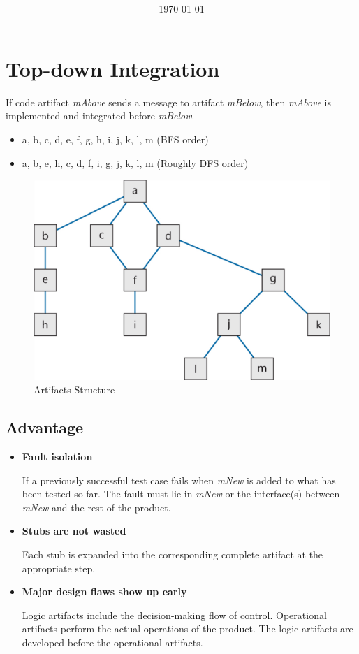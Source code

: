 \documentclass[11pt]{article}
\title{\textbf{\Topic}}
\author{\Name}
\date{\today}
\begin{document}
\maketitle
\noindent\makebox[\linewidth]{\rule[8pt]{5in}{0.5pt}}

\section*{Top-down Integration}

If code artifact \textit{mAbove} sends a message to artifact \textit{mBelow}, then \textit{mAbove} is implemented and integrated before \textit{mBelow}.

\begin{itemize}
	\item a, b, c, d, e, f, g, h, i, j, k, l, m (BFS order)
	\item a, b, e, h, c, d, f, i, g, j, k, l, m (Roughly DFS order)
\end{itemize}

\begin{figure}[h]
	\centering
	\includegraphics[width=0.6\linewidth]{images/TopDown.png}
	\caption{Artifacts Structure}
	\label{fig:TopDown}
\end{figure}

\subsection*{Advantage}

\begin{itemize}
	\item \textbf{Fault isolation}
	
	If a previously successful test case fails when \textit{mNew} is added to what has been tested so far. The fault must lie in \textit{mNew} or the interface(s) between \textit{mNew} and the rest of the product.
	
	\item \textbf{Stubs are not wasted}
	
	Each stub is expanded into the corresponding complete artifact at the appropriate step.
	
	\item \textbf{Major design flaws show up early}
	
	Logic artifacts include the decision-making flow of control. Operational artifacts perform the actual operations of the product. The logic artifacts are developed before the operational artifacts.
	
\end{itemize}
\end{document}
